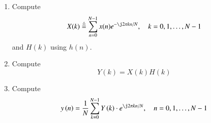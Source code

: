 \documentclass[journal,12pt,twocolumn]{IEEEtran}
\newcommand{\define}{\stackrel{\triangle}{=}}
\theoremstyle{remark}
\renewcommand\thesection{\arabic{section}}
\numberwithin{equation}{subsection}
\begin{document}
\begin{enumerate}[label=\thesection.\arabic*]
\item
Compute
\begin{equation}
X(k) \define \sum _{n=0}^{N-1}x(n) e^{-\j2\pi kn/N}, \quad k = 0,1,\dots, N-1
\end{equation}
and $H(k)$ using $h(n)$.
\item Compute 
\begin{equation}
Y(k) = X(k)H(k)
\label{eq:fp}
\end{equation}
\item Compute
\begin{equation}
y\brak{n}={\frac {1}{N}}\sum _{k=0}^{N-1}Y\brak{k}\cdot e^{\j 2\pi kn/N},\quad n = 0,1,\dots, N-1
\label{eq:inv-ft}
\end{equation}


\end{enumerate}
\end{document}
